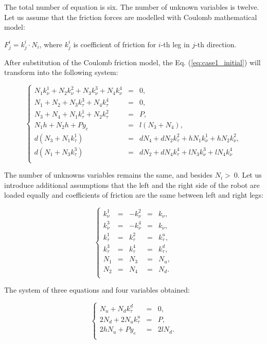 \documentclass{ws-procs9x6}
\begin{document}
The total number of equation is six. The number of unknown variables is twelve. Let us assume that the friction forces are modelled with Coulomb mathematical model:

$F_j^i = k_j^i\cdot N_i$, where $k_j^i$ is coefficient of friction for $i$-th leg in $j$-th direction.

After substitution of the Coulomb friction model, the Eq. (\ref{eq:case1_initial}) will transform into the following system:

\begin{equation}
\label{eq:case1_subs_kulon}
\left\{
\begin{array}{rcl}
  N_1k_\nu^1 + N_2k_\nu^2 + N_3k_\nu^3 + N_4k_\nu^4 &=& 0,\\
  N_1 + N_2 + N_3k_\tau^3 + N_4k_\tau^4 &=& 0, \\
  N_3 + N_4 + N_1k_\tau^1 + N_2k_\tau^2 &=& P, \\
  N_1h + N_2h + Py_c &=& l(N_3 + N_4), \\
  d(N_3 + N_1k_\tau^1) &=& dN_4 + dN_2k_\tau^2 + hN_1k_\nu^1 + hN_2k_\nu^2,\\
  d(N_1 + N_3k_\tau^3) &=& dN_2 + dN_4k_\tau^4 + lN_3k_\nu^3 + lN_4k_\nu^4\\
\end{array}
\right.
\end{equation}

The number of unknowns variables remains the same, and besides $N_i >~0$. Let us introduce additional assumptions that the left and the right side of the robot are loaded equally and coefficients of friction are the same between left and right legs:

\begin{equation}
\label{eq:case1_assumptions_1_and_2}
\left\{
\begin{array}{rcccl}
    k_\nu^1  &=& -k_\nu^2&=& k_\nu,\\
    k_\nu^3  &=& -k_\nu^4&=& k_\nu,\\
    k_\tau^1 &= &k_\tau^2&=& k_\tau^u,\\
    k_\tau^3 &= &k_\tau^4&=& k_\tau^d,\\
    N_1 &=& N_3 &=& N_u, \\
    N_2 &=& N_4 &=& N_d. \\
\end{array}
\right.
\end{equation}

The system of three equations and four variables obtained:

\begin{equation}
\label{eq:case1_subs_assumptions_1_and_2}
\left\{
\begin{array}{rcl}
  N_u + N_dk_\tau^d &=& 0, \\
  2N_d + 2N_uk_\tau^u &=& P, \\
  2hN_u + Py_c &=& 2lN_d.\\
\end{array}
\right.
\end{equation}
  
\end{document}
